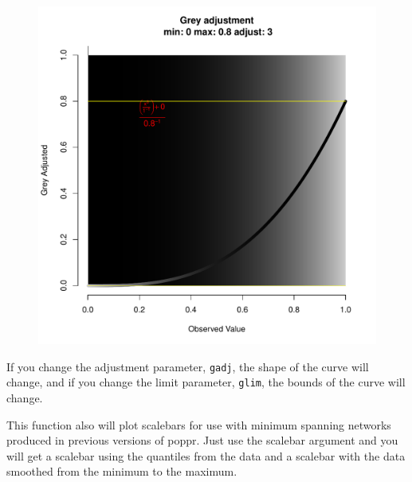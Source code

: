 \documentclass[letterpaper]{article}\usepackage[]{graphicx}\usepackage[]{color}
\newenvironment{knitrout}{}{} %
\begin{document}
\begin{figure}[h!]
\begin{minipage}[b]{0.45\linewidth}
\begin{knitrout}
{\centering \includegraphics[width=\linewidth]{figure/greywidth_inverse} 

}



\end{knitrout}

\end{minipage}
\end{figure}

If you change the adjustment parameter, \texttt{gadj}, the shape of the curve
will change, and if you change the limit parameter, \texttt{glim}, the bounds of
the curve will change.

This function also will plot scalebars for use with minimum spanning networks produced in previous versions of poppr. Just use the scalebar argument and you
will get a scalebar using the quantiles from the data and a scalebar with the 
data smoothed from the minimum to the maximum.
\end{document}
